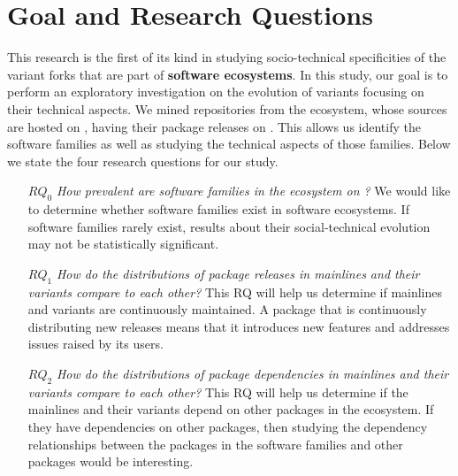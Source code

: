 \section{Goal and Research Questions}
This research is the first of its kind in studying socio-technical specificities of the variant forks that are part of \textbf{software ecosystems}. In this study, our goal is to perform an exploratory investigation on the evolution of variants focusing on their technical aspects. We mined repositories from the \js ecosystem, whose sources are hosted on \gh, having their package releases on \npm. This allows us identify the software families as well as studying the technical aspects of those families.
Below we state the four research questions for our study.
\begin{itemize}
\item[\textbf{$RQ_0$}] \textit{How prevalent are software families in the \js ecosystem on \gh?}
We would like to determine whether software families exist in software ecosystems. If software families rarely exist, results about their social-technical evolution may not be statistically significant.
\item[\textbf{$RQ_1$}] \textit{How do the distributions of package releases in mainlines and their variants compare to each other?}
This RQ will help us determine if mainlines and variants are continuously maintained. A package that is continuously distributing new releases means that it introduces new features and addresses issues raised by its users.


\item[\textbf{$RQ_2$}] \textit{How do the distributions of package dependencies in mainlines and their variants compare to each other?}
This RQ will help us determine if the mainlines and their variants depend on other packages in the \np ecosystem. If they have dependencies on other packages, then studying the dependency relationships between the packages in the software families and other packages would be interesting.


\end{itemize}
